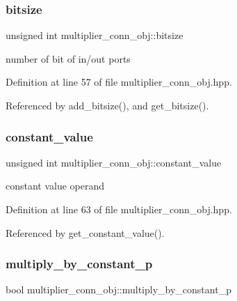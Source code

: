\subsubsection{\texorpdfstring{bitsize}{bitsize}}
{\footnotesize\ttfamily unsigned int multiplier\+\_\+conn\+\_\+obj\+::bitsize\hspace{0.3cm}{\ttfamily [private]}}



number of bit of in/out ports 



Definition at line 57 of file multiplier\+\_\+conn\+\_\+obj.\+hpp.



Referenced by add\+\_\+bitsize(), and get\+\_\+bitsize().

\mbox{\label{classmultiplier__conn__obj_a1d06a00581692ff951adf1d7a44cf929}} 
\subsubsection{\texorpdfstring{constant\+\_\+value}{constant\_value}}
{\footnotesize\ttfamily unsigned int multiplier\+\_\+conn\+\_\+obj\+::constant\+\_\+value\hspace{0.3cm}{\ttfamily [private]}}



constant value operand 



Definition at line 63 of file multiplier\+\_\+conn\+\_\+obj.\+hpp.



Referenced by get\+\_\+constant\+\_\+value().

\mbox{\label{classmultiplier__conn__obj_a27dcb916013135f4d7cdfadaeb368bcf}} 
\subsubsection{\texorpdfstring{multiply\+\_\+by\+\_\+constant\+\_\+p}{multiply\_by\_constant\_p}}
{\footnotesize\ttfamily bool multiplier\+\_\+conn\+\_\+obj\+::multiply\+\_\+by\+\_\+constant\+\_\+p\hspace{0.3cm}{\ttfamily [private]}}



